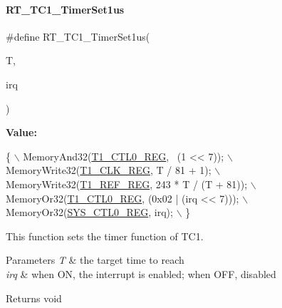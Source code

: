 \paragraph{\texorpdfstring{R\+T\+\_\+\+T\+C1\+\_\+\+Timer\+Set1us}{RT\_TC1\_TimerSet1us}}
{\footnotesize\ttfamily \#define R\+T\+\_\+\+T\+C1\+\_\+\+Timer\+Set1us(\begin{DoxyParamCaption}\item[{}]{T,  }\item[{}]{irq }\end{DoxyParamCaption})}

{\bfseries Value\+:}
\begin{DoxyCode}
\{                                                  \(\backslash\)
        MemoryAnd32(\mbox{\hyperlink{a00020_a55600694c3c73a1019f78d306f474fa1}{T1\_CTL0\_REG}}, ~(1 << 7));           \(\backslash\)
        MemoryWrite32(\mbox{\hyperlink{a00020_a319b804c31cf3d17dad1df712b0e1a95}{T1\_CLK\_REG}}, T / 81 + 1);             \(\backslash\)
        MemoryWrite32(\mbox{\hyperlink{a00020_ad17cf3aaa6ae5443a01b748050e708a1}{T1\_REF\_REG}}, 243 * T / (T + 81)); \(\backslash\)
        MemoryOr32(\mbox{\hyperlink{a00020_a55600694c3c73a1019f78d306f474fa1}{T1\_CTL0\_REG}}, (0x02 | (irq << 7)));  \(\backslash\)
        MemoryOr32(\mbox{\hyperlink{a00020_ab34acec79daf4fcc12a662cde9e75df7}{SYS\_CTL0\_REG}}, irq);                 \(\backslash\)
    \}
\end{DoxyCode}


This function sets the timer function of T\+C1. 


\begin{DoxyParams}{Parameters}
{\em T} & the target time to reach \\
\hline
{\em irq} & when ON, the interrupt is enabled; when O\+FF, disabled \\
\hline
\end{DoxyParams}
\begin{DoxyReturn}{Returns}
void 
\end{DoxyReturn}
